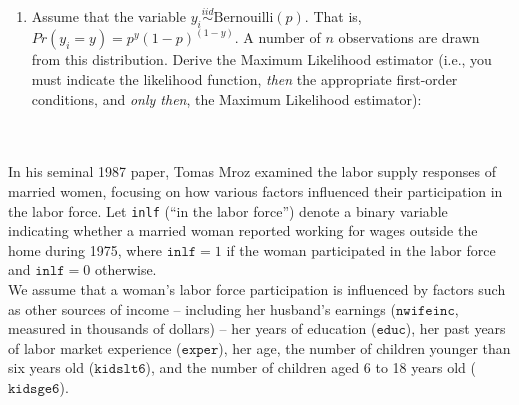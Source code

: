 \documentclass{article}
\begin{document}
\begin{enumerate}
{}\\[1em]

\newpage
    \item  Assume that the variable $y_i\stackrel{iid}{\sim}\text{Bernouilli}(p)$. That is, $Pr(y_i=y) = p^y (1-p)^{(1-y)}$. A number of $n$ observations are drawn from this distribution. Derive the Maximum Likelihood estimator (i.e., you must indicate the likelihood function, \textit{then} the appropriate first-order conditions, and \textit{only then}, the Maximum Likelihood estimator): \\[1em]
\\[1em]




\end{enumerate}

\newpage
{}\\[1.5em]

In his seminal 1987 paper, Tomas Mroz examined the labor supply responses of married women, focusing on how various factors influenced their participation in the labor force. Let \texttt{inlf} (“in the labor force”) denote a binary variable indicating whether a married woman reported working for wages outside the home during 1975, where \(\texttt{inlf} = 1\) if the woman participated in the labor force and \(\texttt{inlf} = 0\) otherwise.\\

We assume that a woman’s labor force participation is influenced by factors such as other sources of income -- including her husband’s earnings (\(\texttt{nwifeinc}\), measured in thousands of dollars) -- her years of education (\(\texttt{educ}\)), her past years of labor market experience (\(\texttt{exper}\)), her age, the number of children younger than six years old (\(\texttt{kidslt6}\)), and the number of children aged 6 to 18 years old (\(\texttt{kidsge6}\)).\\
\end{document}
